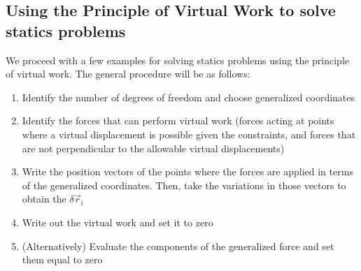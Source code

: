\subsection{Using the Principle of Virtual Work to solve statics problems}
We proceed with a few examples for solving statics problems using the principle of virtual work. The general procedure will be as follows:
\begin{enumerate}
\item Identify the number of degrees of freedom and choose generalized coordinates 
\item Identify the forces that can perform virtual work (forces acting at points where a virtual displacement is possible given the constraints, and forces that are not perpendicular to the allowable virtual displacements)
\item Write the position vectors of the points where the forces are applied in terms of the generalized coordinates. Then, take the variations in those vectors to obtain the $\delta \vec r_i$
\item Write out the virtual work and set it to zero
\item (Alternatively) Evaluate the components of the generalized force and set them equal to zero
\end{enumerate}



